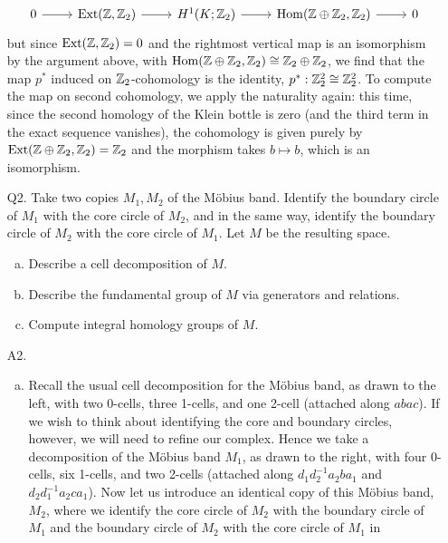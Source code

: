 \documentclass{../mathnotes}
\begin{document}
\begin{enumerate}
\begin{equation*}
\begin{tikzcd}
                0\ar{r}& \Ext(\Z,\Z_2)\ar{r}& H^1(K;\Z_2)\ar{r}& \Hom(\Z\oplus\Z_2,\Z_2)\ar{r}& 0
            \end{tikzcd}
        \end{equation*}
        but since $\operatorname{Ext}(\mathbb{Z},\mathbb{Z}_2)=0$ and the rightmost vertical map is an isomorphism by
        the argument above, with $\operatorname{Hom}(\mathbb{Z}\oplus\mathbb{Z}_2,\mathbb{Z}_2)\cong\mathbb{Z}_2\oplus\mathbb{Z}_2$, we find
        that the map $p^*$ induced on $\mathbb{Z}_2$-cohomology is the identity, $p^*:\mathbb{Z}_2^2\cong\mathbb{Z}_2^2$.
        To compute the map on second cohomology, we apply the naturality again: this time,
        since the second homology of the Klein bottle is zero (and the third term in the exact
        sequence vanishes), the cohomology is given purely by $\operatorname{Ext}(\mathbb{Z}\oplus\mathbb{Z}_2,\mathbb{Z}_2)=\mathbb{Z}_2$
        and the morphism takes $b\mapsto b$, which is an isomorphism.
        \newpage
    \item[Q2.] Take two copies $M_1,M_2$ of the M\"obius band. Identify the boundary
        circle of $M_1$ with the core circle of $M_2$, and in the same way, identify the boundary
        circle of $M_2$ with the core circle of $M_1$. Let $M$ be the resulting space.
        \begin{enumerate}[(a)]
            \item Describe a cell decomposition of $M$.
            \item Describe the fundamental group of $M$ via generators and relations.
            \item Compute integral homology groups of $M$.
        \end{enumerate}
    \item[A2.]
        \begin{enumerate}[(a)]
            \item Recall the usual cell decomposition for the M\"obius band, as drawn to the left,
                with two 0-cells, three 1-cells, and one 2-cell (attached along $abac$).
                If we wish to think about
                identifying the core and boundary circles, however, we will need to refine
                our complex. Hence we take a decomposition of the M\"obius band $M_1$, as drawn to the
                right, with four 0-cells, six 1-cells, and two 2-cells (attached along $d_1d_2^{-1}a_2ba_1$
                and $d_2d_1^{-1}a_2ca_1$). Now let us introduce an identical copy of this
                M\"obius band, $M_2$, where we identify the core circle of $M_2$ with the boundary
                circle of $M_1$ and the boundary circle of $M_2$ with the core circle of $M_1$ in

\end{enumerate}
\end{enumerate}
\end{document}
